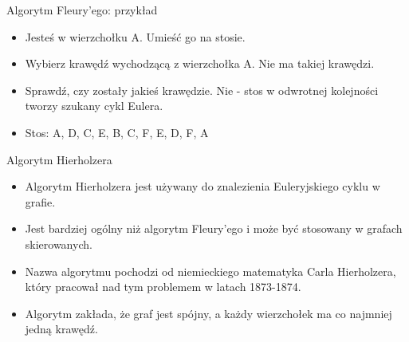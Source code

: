 \documentclass[polish,envcountsect,10pt]{beamer}
\begin{document}
\begin{frame}{Algorytm Fleury'ego: przykład}
    \begin{itemize}
        \item Jesteś w wierzchołku A. Umieść go na stosie.
        \item Wybierz krawędź wychodzącą z wierzchołka A. Nie ma takiej krawędzi.
        \item Sprawdź, czy zostały jakieś krawędzie. Nie - stos w odwrotnej kolejności tworzy szukany cykl Eulera.
        \item Stos: A, D, C, E, B, C, F, E, D, F, A
    \end{itemize}
    \begin{center}
    \end{center}
\end{frame}

\begin{frame}{Algorytm Hierholzera}
    \begin{itemize}
        \item Algorytm Hierholzera jest używany do znalezienia Euleryjskiego cyklu w grafie.
        \item Jest bardziej ogólny niż algorytm Fleury'ego i może być stosowany w grafach skierowanych.
        \item Nazwa algorytmu pochodzi od niemieckiego matematyka Carla Hierholzera, który pracował nad tym problemem w latach 1873-1874.
        \item Algorytm zakłada, że graf jest spójny, a każdy wierzchołek ma co najmniej jedną krawędź.
    \end{itemize}
\end{frame}
    
\end{document}
